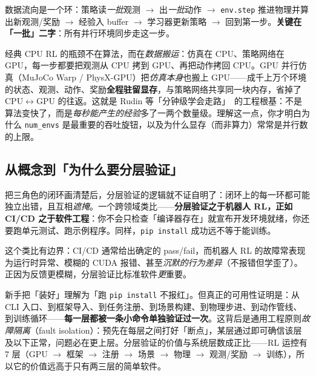数据流向是一个环：策略读\emph{一批}观测 $\to$ 出\emph{一批}动作 $\to$ \verb|env.step| 推进物理并算出新观测/奖励 $\to$ 经验入 buffer $\to$ 学习器更新策略 $\to$ 回到第一步。\textbf{关键在「一批」二字}：所有并行环境同步走这一步。

\begin{insight}\label{ins:rlmc-zero-copy}
经典 CPU RL 的瓶颈不在算法，而在\emph{数据搬运}：仿真在 CPU、策略网络在 GPU，每一步都要把观测从 CPU 拷到 GPU、再把动作拷回 CPU。GPU 并行仿真（MuJoCo Warp / PhysX-GPU）把\emph{仿真本身}也搬上 GPU——成千上万个环境的状态、观测、动作、奖励\textbf{全程驻留显存}，与策略网络共享同一块内存，省掉了 CPU$\leftrightarrow$GPU 的往返。这就是 Rudin 等「分钟级学会走路」\,\cite{rudin2021minutes} 的工程根基：不是算法变快了，而是\emph{每秒能产生的经验}多了一两个数量级。理解这一点，你才明白为什么 \verb|num_envs| 是最重要的吞吐旋钮，以及为什么显存（而非算力）常常是并行数的上限。
\end{insight}

\subsection{从概念到「为什么要分层验证」}

把三角色的闭环画清楚后，分层验证的逻辑就不证自明了：闭环上的每一环都可能独立出错，且互相\emph{遮掩}。一个跨领域类比——\textbf{分层验证之于机器人 RL，正如 CI/CD 之于软件工程}：你不会只检查「编译器存在」就宣布开发环境就绪，你还要跑单元测试、跑示例程序。同样，\verb|pip install| 成功远不等于能训练。

这个类比有边界：CI/CD 通常给出确定的 pass/fail，而机器人 RL 的故障常表现为运行时异常、模糊的 CUDA 报错、甚至\emph{沉默的行为差异}（不报错但学歪了）。正因为反馈更模糊，分层验证比标准软件\emph{更}重要。

\begin{insight}\label{ins:rlmc-fault-isolation}
新手把「装好」理解为「跑 \texttt{pip install} 不报红」。但真正的可用性证明是：从 CLI 入口、到框架导入、到任务注册、到场景构建、到物理步进、到动作管线、到训练循环——\textbf{每一层都被一条小命令单独验证过一次}。这背后是通用工程原则\emph{故障隔离}（fault isolation）：预先在每层之间打好「断点」，某层通过即可确信该层及以下正常，问题必在更上层。分层验证的价值与系统层数成正比——RL 运控有 7 层（GPU $\to$ 框架 $\to$ 注册 $\to$ 场景 $\to$ 物理 $\to$ 观测/奖励 $\to$ 训练），所以它的价值远高于只有两三层的简单软件。
\end{insight}

